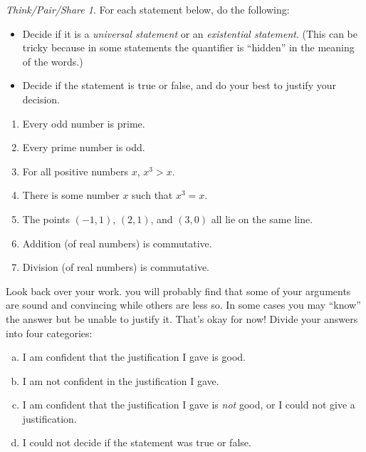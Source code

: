 \documentclass[10pt, reqno]{amsart}
\theoremstyle{remark}
\newtheorem*{thinkpair*}{Think/Pair/Share}
\theoremstyle{definition}
\numberwithin{equation}{section}  %
\begin{document}
\begin{thinkpair*}
For each statement below, do the following:
\begin{itemize}
\item
Decide if it is a \emph{universal statement} or an \emph{existential statement}.  (This can be tricky because in some statements the quantifier is ``hidden'' in the meaning of the words.)
\item
Decide if the statement is true or false, and do your best to justify your decision.
\end{itemize}

\begin{enumerate}
\item
Every odd number is prime.
\item
Every prime number is odd.
\item
For all positive numbers $x$, $x^3 > x$.
\item
There is some number $x$ such that $x^3 = x$.
\item
The points $(-1,1)$, $(2,1)$, and $(3,0)$ all lie on the same line.
\item
Addition (of real numbers) is commutative.
\item
Division (of real numbers) is commutative.
\end{enumerate}

Look back over your work.  you will probably find that some of your arguments are sound and convincing while others are less so.  In some cases you may ``know'' the answer but be unable to justify it.  That's okay for now!  Divide your answers into four categories:

\bigskip

\begin{enumerate}[(a)]
\item
I am confident that the justification I gave is good.
\item
I am not confident in the justification I gave.
\item
I am confident that the justification I gave is \emph{not} good, or I could not give a justification.
\item
I could not decide if the statement was true or false.
\end{enumerate}


\end{thinkpair*}
\end{document}
